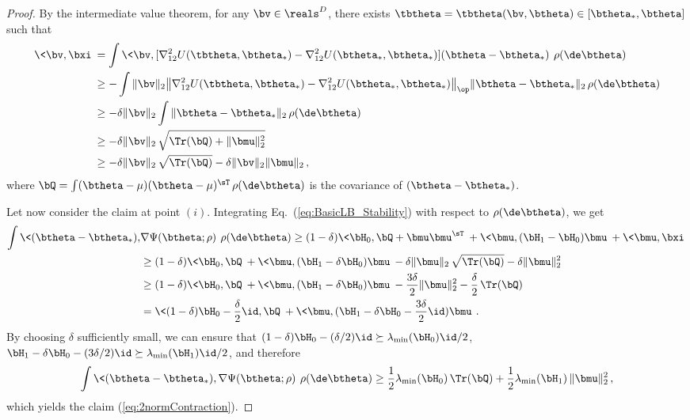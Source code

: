 \documentclass[11pt]{article}
\begin{document}
\begin{proof}
By the intermediate value theorem, for any $\bv\in\reals^D$, there exists $\tbtheta=\tbtheta(\bv,\btheta) \in [\btheta_*,\btheta]$ such that
%
\begin{align}
%
\<\bv,\bxi\> &= \int \<\bv,[\nabla^{2}_{12}U( \tbtheta,\btheta_*) -\nabla^{2}_{12}U( \btheta_*,\btheta_*)]  (\btheta-\btheta_*) \>\, \rho(\de\btheta)\\
&\ge - \int \|\bv\|_2\big\|\nabla^{2}_{12}U( \tbtheta,\btheta_*) -\nabla^{2}_{12}U( \btheta_*,\btheta_*)\big\|_{\op} \|\btheta-\btheta_*\|_2\, \rho(\de\btheta)\\
& \ge -\delta\|\bv\|_2\int \|\btheta-\btheta_*\|_2\, \rho(\de\btheta)\\
&\ge -\delta\|\bv\|_2\, \sqrt{\Tr(\bQ)+\|\bmu\|_2^2}\label{eq:vbxi}\\
&\ge -\delta\|\bv\|_2\, \sqrt{\Tr(\bQ)}-\delta\|\bv\|_2\|\bmu\|_2\, ,
%
\end{align}
%
where $\bQ= \int (\btheta-\mu)(\btheta-\mu)^{\sT}\, \rho(\de\btheta)$ is the covariance of $(\btheta-\btheta_*)$.

Let now consider the claim at point $(i)$. Integrating Eq.~(\ref{eq:BasicLB_Stability}) with respect to $\rho(\de\btheta)$, 
we get
%
\begin{align}
%
\int\<(\btheta-\btheta_*),&\nabla\Psi(\btheta;\rho)\>\, \rho(\de\btheta) \ge  (1-\delta) \<\bH_0,\bQ+\bmu\bmu^{\sT}\>+
\<\bmu,(\bH_1-\bH_0)\bmu\> +\<\bmu,\bxi\>\\
&\ge (1-\delta)\<\bH_0,\bQ\>+\<\bmu,(\bH_1-\delta\bH_0)\bmu\>-\delta\|\bmu\|_2\, \sqrt{\Tr(\bQ)}-\delta\|\bmu\|_2^2\\
& \ge (1-\delta)\<\bH_0,\bQ\>+\<\bmu,(\bH_1-\delta\bH_0)\bmu\>-\frac{3\delta}{2}\|\bmu\|_2^2-\frac{\delta}{2}\,\Tr(\bQ)\\
&= \<(1-\delta)\bH_0-\frac{\delta}{2}\id,\bQ\>+\<\bmu,(\bH_1-\delta\bH_0-\frac{3\delta}{2}\id)\bmu\>
\, .
%
\end{align}
%
By choosing $\delta$ sufficiently small, we can ensure that $(1-\delta)\bH_0-(\delta/2)\id\succeq \lambda_{\min}(\bH_0)\id/2$,
$\bH_1-\delta\bH_0-(3\delta/2)\id\succeq \lambda_{\min}(\bH_1)\id/2$, and therefore
%
\begin{align}
%
\int\<(\btheta-\btheta_*),\nabla\Psi(\btheta;\rho)\>\, \rho(\de\btheta) \ge  \frac{1}{2}\lambda_{\min}(\bH_0)\, \Tr(\bQ)+
\frac{1}{2}\lambda_{\min}(\bH_1)\, \|\bmu\|_2^2\, ,
%
\end{align}
%
which yields the claim (\ref{eq:2normContraction}).


\end{proof}
\end{document}
